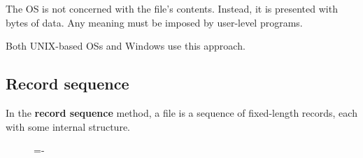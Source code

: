\documentclass[a4paper]{systems-software}
\begin{document}
The OS is not concerned with the file's contents. Instead, it is presented with bytes of data. Any meaning must be imposed by user-level programs.

Both UNIX-based OSs and Windows use this approach.


\subsection*{Record sequence}

In the \textbf{record sequence} method, a file is a sequence of fixed-length records, each with some internal structure.

\begin{figure}[H]
  \lineskip=-\fboxrule
\end{figure}
\end{document}
